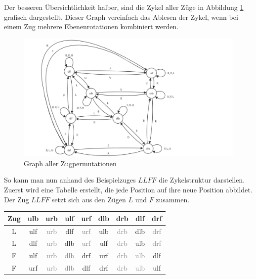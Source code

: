 \documentclass[12pt,a4paper, usenames, dvipsnames]{article}
\theoremstyle{mystyle}
\theoremstyle{definition}
\begin{document}
 
Der besseren Übersichtlichkeit halber, sind die Zykel aller Züge in Abbildung \ref{2} grafisch dargestellt.
Dieser Graph vereinfach das Ablesen der Zykel, wenn bei einem Zug mehrere Ebenenrotationen kombiniert werden.
\begin{figure}[H]
\centering
\includegraphics[scale=0.27]{graph_zug.png}
\caption[Graph aller Zugpermutationen]{Graph aller Zugpermutationen}
\label{2}
\end{figure}

So kann man nun anhand des Beispielzuges $LLFF$ die Zykelstruktur darstellen. 
Zuerst wird eine Tabelle erstellt, die jede Position auf ihre neue Position abbildet. Der Zug $LLFF$ setzt sich aus den Zügen $L$ und $F$ zusammen. 

\begin{center}
\begin{tabular}{ccccccccc}
\toprule
\textbf{Zug} & \textbf{ulb} & \textbf{urb} & \textbf{ulf} & \textbf{urf} & \textbf{dlb} & \textbf{drb} & \textbf{dlf} & \textbf{drf} \\
\midrule

L & ulf & \textcolor{gray}{urb} & dlf & \textcolor{gray}{urf} & ulb & \textcolor{gray}{drb} & dlb & \textcolor{gray}{drf} \\

L & dlf & \textcolor{gray}{urb} & dlb & \textcolor{gray}{urf} & ulf & \textcolor{gray}{drb} & ulb & \textcolor{gray}{drf} \\

F & ulf & \textcolor{gray}{urb} & \textcolor{gray}{dlb} & drf & urf & \textcolor{gray}{drb} & \textcolor{gray}{ulb} & dlf \\

F & urf & \textcolor{gray}{urb} & \textcolor{gray}{dlb} & dlf & drf & \textcolor{gray}{drb} & \textcolor{gray}{ulb} & ulf \\
\bottomrule
\end{tabular}
\end{center}
\end{document}
